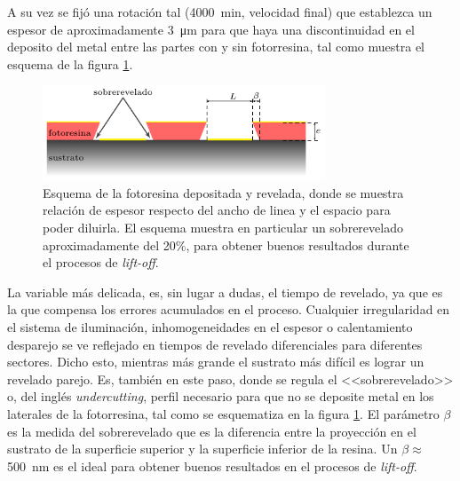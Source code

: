 {     		 A su vez se fijó una rotación tal (\SI{4000}{\minute}, velocidad final) que establezca un espesor de aproximadamente \SI{3}{\um} para que haya una discontinuidad en el deposito del metal entre las partes con y sin fotorresina, tal como muestra el esquema de la figura \ref{fig:undercut}.

 				\begin{figure}[ht!]
 				\centering
 				\includegraphics[width=0.75\textwidth]{Esquemas/altura-ancho.pdf}
 				\caption[Perfil de fotorresina para el decapado o\textit{ lift-off}]{Esquema de la fotoresina depositada y revelada, donde se muestra relación de espesor respecto del ancho de linea y el espacio para poder diluirla. El esquema muestra en particular un sobrerevelado aproximadamente del 20\%, para obtener buenos resultados durante el procesos de\textit{ lift-off}.}
 				\label{fig:undercut}
 				\end{figure}

 	   		 La variable más delicada, es, sin lugar a dudas, el tiempo de revelado, ya que es la que compensa los errores acumulados en el proceso. Cualquier irregularidad en el sistema de iluminación, inhomogeneidades en el espesor o calentamiento desparejo se ve reflejado en tiempos de revelado diferenciales para diferentes sectores. Dicho esto, mientras más grande el sustrato más difícil es lograr un revelado parejo. Es, también en este paso, donde se regula el <<sobrerevelado>> o, del inglés \textit{undercutting}, perfil necesario para que no se deposite metal en los laterales de la fotorresina, tal como se esquematiza en la figura \ref{fig:undercut}. El parámetro $\beta$ es la medida del sobrerevelado que es la diferencia entre la proyección en el sustrato de la superficie superior y la superficie inferior de la resina. Un $\beta \approx$\SI{500}{\nm} es el ideal para obtener buenos resultados en el procesos de \textit{lift-off}. 
 
}
